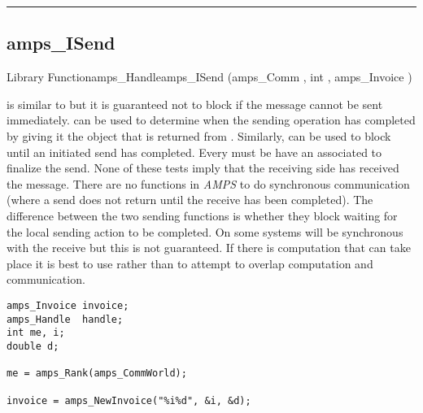 
\noindent\rule{\textwidth}{1mm}

\subsection{amps\_ISend}
\label{amps_ISend}


\begin{deftypefn}{Library Function}{amps_Handle}{amps\_ISend}
(amps_Comm , int , amps_Invoice ) 

\DESCRIPTION

 is similar to  but it is guaranteed
not to block if the message cannot be sent immediately.
 can be used to determine when the sending operation has
completed by giving it the  object that is returned from
.  Similarly,  can be used to block
until an initiated send has completed.  Every  must be
have an associated  to finalize the send.  None of these
tests imply that the receiving side has received the message.  There are
no functions in {\em AMPS} to do synchronous communication (where a send
does not return until the receive has been completed).  The difference
between the two sending functions is whether they block waiting for the
local sending action to be completed.  On some systems 
will be synchronous with the receive but this is not guaranteed.  If there
is computation that can take place it is best to use 
rather than  to attempt to overlap computation and
communication.

\EXAMPLE

\begin{display}\begin{verbatim}
amps_Invoice invoice;
amps_Handle  handle;
int me, i;
double d;

me = amps_Rank(amps_CommWorld);

invoice = amps_NewInvoice("%i%d", &i, &d);


\end{verbatim}
\end{display}
\end{deftypefn}
